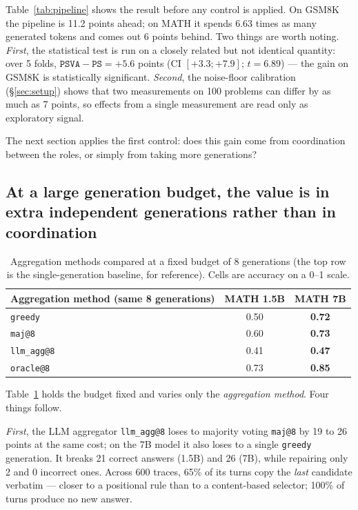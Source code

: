 \documentclass[11pt,a4paper]{article}
\begin{document}
Table~\ref{tab:pipeline} shows the result before any control is applied. On GSM8K the pipeline is 11.2 points ahead; on MATH it spends 6.63 times as many generated tokens and comes out 6 points behind. Two things are worth noting. \emph{First}, the statistical test is run on a closely related but not identical quantity: over 5 folds, $\texttt{PSVA}-\texttt{PS} = +5.6$ points (CI $[+3.3;+7.9]$; $t=6.89$) --- the gain on GSM8K is statistically significant. \emph{Second}, the noise-floor calibration (\S\ref{sec:setup}) shows that two measurements on 100 problems can differ by as much as 7 points, so effects from a single measurement are read only as exploratory signal.

The next section applies the first control: does this gain come from coordination between the roles, or simply from taking more generations?

\subsection{At a large generation budget, the value is in extra independent generations rather than in coordination}\label{sec:budget}

\begin{table}[h]\centering\small
\begin{tabular}{@{}l c c@{}}
\toprule
Aggregation method (same 8 generations) & MATH 1.5B & MATH 7B\\
\midrule
\texttt{greedy} & 0.50 & \textbf{0.72}\\
\texttt{maj@8}     & 0.60 & \textbf{0.73}\\
\texttt{llm\_agg@8} & 0.41 & \textbf{0.47}\\
\texttt{oracle@8}      & 0.73 & \textbf{0.85}\\
\bottomrule
\end{tabular}
\caption{Aggregation methods compared at a fixed budget of 8 generations (the top row is the
single-generation baseline, for reference). Cells are accuracy on a 0--1 scale.}
\label{tab:budget}
\end{table}

Table~\ref{tab:budget} holds the budget fixed and varies only the \emph{aggregation method}. Four things follow.

\emph{First}, the LLM aggregator \texttt{llm\_agg@8} loses to majority voting \texttt{maj@8} by 19 to 26 points at the same cost; on the 7B model it also loses to a single \texttt{greedy} generation. It breaks 21 correct answers (1.5B) and 26 (7B), while repairing only 2 and 0 incorrect ones. Across 600 traces, 65\% of its turns copy the \emph{last} candidate verbatim --- closer to a positional rule than to a content-based selector; 100\% of turns produce no new answer.
\end{document}
